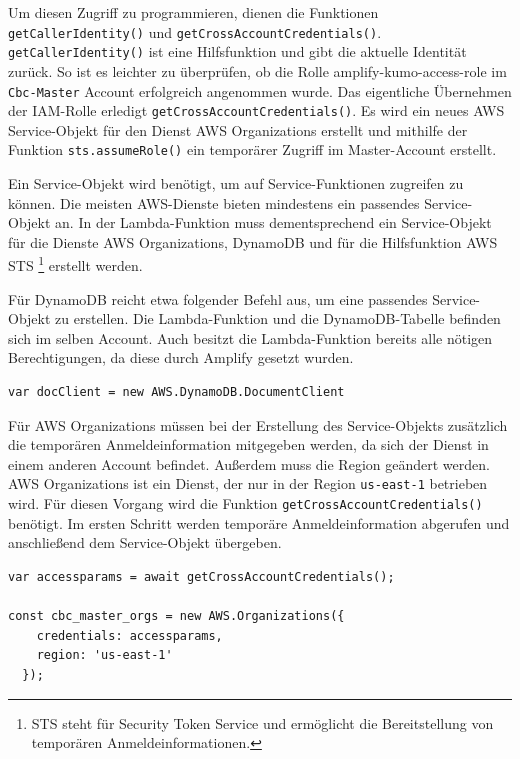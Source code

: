 Um diesen Zugriff zu programmieren, dienen die Funktionen \verb+getCallerIdentity()+ und \verb+getCrossAccountCredentials()+.
\verb+getCallerIdentity()+ ist eine Hilfsfunktion und gibt die aktuelle Identität zurück.
So ist es leichter zu überprüfen, ob die Rolle \grqq amplify-kumo-access-role\grqq{} im \verb+Cbc-Master+ Account erfolgreich angenommen wurde.
Das eigentliche Übernehmen der IAM-Rolle erledigt \verb+getCrossAccountCredentials()+.
Es wird ein neues AWS Service-Objekt für den Dienst AWS Organizations erstellt und mithilfe der Funktion \verb+sts.assumeRole()+ ein temporärer Zugriff im Master-Account erstellt.

Ein Service-Objekt wird benötigt, um auf Service-Funktionen zugreifen zu können.
Die meisten AWS-Dienste bieten mindestens ein passendes Service-Objekt an.
In der Lambda-Funktion muss dementsprechend ein Service-Objekt für die Dienste AWS Organizations, DynamoDB und für die Hilfsfunktion AWS STS \footnote{STS steht für Security Token Service und ermöglicht die Bereitstellung von temporären Anmeldeinformationen.} erstellt werden.
\cite[]{ServiceObject}

Für DynamoDB reicht etwa folgender Befehl aus, um eine passendes Service-Objekt zu erstellen.
Die Lambda-Funktion und die DynamoDB-Tabelle befinden sich im selben Account.
Auch besitzt die Lambda-Funktion bereits alle nötigen Berechtigungen, da diese durch Amplify gesetzt wurden.
\\
\begin{lstlisting}[basicstyle=\ttfamily\small, breaklines=true , frame = single, backgroundcolor=\color{flashwhite} ]
var docClient = new AWS.DynamoDB.DocumentClient
\end{lstlisting}


Für AWS Organizations müssen bei der Erstellung des Service-Objekts zusätzlich die temporären Anmeldeinformation mitgegeben werden, da sich der Dienst in einem anderen Account befindet.
Außerdem muss die Region geändert werden.
AWS Organizations ist ein Dienst, der nur in der Region \verb+us-east-1+ betrieben wird.
Für diesen Vorgang wird die Funktion \verb+getCrossAccountCredentials()+ benötigt.
Im ersten Schritt werden temporäre Anmeldeinformation abgerufen und anschließend dem Service-Objekt übergeben.

\begin{lstlisting}[basicstyle=\ttfamily\small, breaklines=true , frame = single, backgroundcolor=\color{lightgray}, caption={Neues ServiceObject mit einer anderen Identität (Datei: \textit{\nameref{lst:LambdaCode}} )} ]
var accessparams = await getCrossAccountCredentials();

const cbc_master_orgs = new AWS.Organizations({
    credentials: accessparams,
    region: 'us-east-1'
  });
\end{lstlisting}


